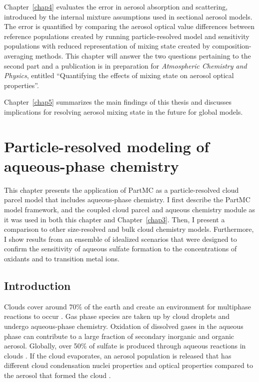 \documentclass[edeposit,fullpage]{uiucthesis2009}
\begin{document}
Chapter~\ref{chap4} evaluates the error in aerosol absorption and
scattering, introduced by the internal mixture assumptions used in
sectional aerosol models. The error is quantified by comparing the
aerosol optical value differences between reference populations
created by running particle-resolved model and sensitivity populations
with reduced representation of mixing state created by
composition-averaging methods. This chapter will answer the two
questions pertaining to the second part and a publication is in
preparation for \textit{Atmospheric Chemistry and Physics}, entitled
``Quantifying the effects of mixing state on aerosol optical
properties''.

Chapter~\ref{chap5} summarizes the main findings of this thesis and discusses
implications for resolving aerosol mixing state in the future for
global models.
\chapter{Particle-resolved modeling of aqueous-phase chemistry}
\label{chap2}
This chapter presents the application of PartMC as a particle-resolved
cloud parcel model that includes aqueous-phase chemistry. I first
describe the PartMC model framework, and the coupled cloud parcel and
aqueous chemistry module as it was used in both this chapter and
Chapter~\ref{chap3}. Then, I present a comparison to other
size-resolved and bulk cloud chemistry models. Furthermore, I show
results from an ensemble of idealized scenarios that were designed to
confirm the sensitivity of aqueous sulfate formation to the
concentrations of oxidants and to transition metal ions.

\label{chap2:mon}
\section{Introduction}

Clouds cover around 70$\%$ of the earth
\citep{stubenrauch2013assessment} and create an environment for
multiphase reactions to occur \citep{Deguillaume2005}. Gas phase
species are taken up by cloud droplets and undergo aqueous-phase
chemistry. Oxidation of dissolved gases in the aqueous phase can
contribute to a large fraction of secondary inorganic and organic
aerosol. Globally, over 50\% of sulfate is produced through aqueous
reactions in clouds \citep{Philip2014, Roth2016}. If the cloud
evaporates, an aerosol population is released that has different cloud
condensation nuclei properties and optical properties compared to the
aerosol that formed the cloud \citep{Farmer2015, Henning2014}.
\end{document}
